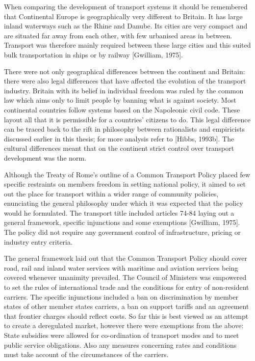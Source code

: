 When comparing the development of transport systems it should be remembered that Continental
Europe is geographically very different to Britain. It has large inland waterways such as the Rhine and Danube. Its cities are very compact and are situated far away from each other, with few urbanised areas in between. Transport was therefore mainly required between these large cities and this suited bulk transportation in ships or by railway [Gwilliam, 1975].

There were not only geographical differences between the continent and Britain: there were also legal differences that have affected the evolution of the transport industry. Britain with its belief in individual freedom was ruled by the common law which aims only to limit people by banning what is against society. Most continental countries follow systems based on the Napoleonic civil code. These layout all that it is permissible for a countries' citizens to do. This legal difference can be traced back to the rift in philosophy between rationalists and empiricists discussed earlier in this thesis; for more analysis refer to [Hibbs, 1993b]. The cultural differences meant that on the continent strict control over transport development was the norm.

Although the Treaty of Rome's outline of a Common Transport Policy placed few specific restraints on members freedom in setting national policy, it aimed to set out the place for transport within a wider range of community policies, enunciating the general philosophy under which it was expected that the policy would he formulated. The transport title included articles 74-84 laying out a general framework, specific injunctions and some exemptions [Gwilliam, 1975]. The policy did not require any government control of infrastructure, pricing or industry entry criteria.

The general framework laid out that the Common Transport Policy should cover road, rail and inland water services with maritime and aviation services being covered whenever unanimity prevailed. The Council of Ministers was empowered to set the rules of international trade and the conditions for entry of non-resident carriers. The specific injunctions included a ban on discrimination by member states of other member states carriers, a ban on support tariffs and an agreement that frontier charges should reflect costs. So far this is best viewed as an attempt to create a deregulated market, however there were exemptions from the above: State subsidies were allowed for co-ordination of transport modes and to meet public service obligations. Also any measures concerning rates and conditions must take account of the circumstances of the carriers.


